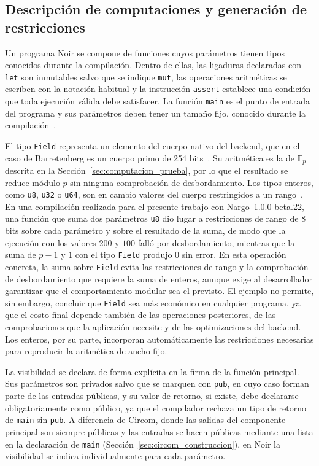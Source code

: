 \subsection{Descripción de computaciones y generación de restricciones}
\label{sec:noir_descripcion}

Un programa Noir se compone de funciones cuyos parámetros tienen tipos conocidos durante la
compilación. Dentro de ellas, las ligaduras declaradas con \lstinline|let| son inmutables salvo
que se indique \lstinline|mut|, las operaciones aritméticas se escriben con la notación habitual
y la instrucción \lstinline|assert| establece una condición que toda ejecución válida debe
satisfacer. La función \lstinline|main| es el punto de entrada del programa y sus parámetros
deben tener un tamaño fijo, conocido durante la compilación~\cite{noirdocsbeta}.

El tipo \lstinline|Field| representa un elemento del cuerpo nativo del backend, que en el caso de
Barretenberg es un cuerpo primo de 254 bits~\cite{noirdocsbeta}. Su aritmética es la de
$\mathbb{F}_p$ descrita en la Sección~\ref{sec:computacion_prueba}, por lo que el resultado se
reduce módulo $p$ sin ninguna comprobación de desbordamiento. Los tipos enteros, como
\lstinline|u8|, \lstinline|u32| o \lstinline|u64|, son en cambio valores del cuerpo restringidos a
un rango~\cite{noirdocsbeta}. En una compilación realizada para el presente trabajo con
Nargo~1.0.0-beta.22, una función que suma dos parámetros \lstinline|u8| dio lugar a
restricciones de rango de 8 bits sobre cada parámetro y sobre el resultado de la suma, de modo
que la ejecución con los valores $200$ y $100$ falló por desbordamiento, mientras que la suma de
$p - 1$ y $1$ con el tipo \lstinline|Field| produjo $0$ sin error. En esta operación concreta, la suma
sobre \lstinline|Field| evita las restricciones de rango y la comprobación de desbordamiento que
requiere la suma de enteros, aunque exige al desarrollador garantizar que el comportamiento
modular sea el previsto. El ejemplo no permite, sin embargo, concluir que \lstinline|Field| sea
más económico en cualquier programa, ya que el costo final depende también de las operaciones
posteriores, de las comprobaciones que la aplicación necesite y de las optimizaciones del
backend. Los enteros, por su parte, incorporan automáticamente las restricciones necesarias para
reproducir la aritmética de ancho fijo.

La visibilidad se declara de forma explícita en la firma de la función principal. Sus
parámetros son privados salvo que se marquen con \lstinline|pub|, en cuyo caso forman parte de
las entradas públicas, y su valor de retorno, si existe, debe declararse obligatoriamente como
público, ya que el compilador rechaza un tipo de retorno de \lstinline|main| sin \lstinline|pub|.
A diferencia de Circom, donde las salidas del componente principal son siempre públicas y las
entradas se hacen públicas mediante una lista en la declaración de \lstinline|main|
(Sección~\ref{sec:circom_construccion}), en Noir la visibilidad se indica individualmente para
cada parámetro.

